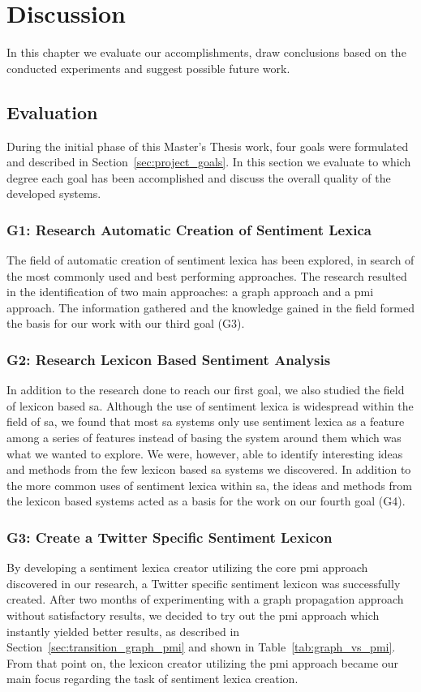 \chapter{Discussion}
\label{cha:discussion}
In this chapter we evaluate our accomplishments, draw conclusions based on the conducted experiments and suggest possible future work. 

\section{Evaluation}
\label{sec:evaluation}
During the initial phase of this Master's Thesis work, four goals were formulated and described in Section~\ref{sec:project_goals}. In this section we evaluate to which degree each goal has been accomplished and discuss the overall quality of the developed systems. 

\subsection*{G1: Research Automatic Creation of Sentiment Lexica}
The field of automatic creation of sentiment lexica has been explored, in search of the most commonly used and best performing approaches. The research resulted in the identification of two main approaches: a graph approach and a \ac{pmi} approach. The information gathered and the knowledge gained in the field formed the basis for our work with our third goal (G3). 

\subsection*{G2: Research Lexicon Based Sentiment Analysis}
In addition to the research done to reach our first goal, we also studied the field of lexicon based \ac{sa}. Although the use of sentiment lexica is widespread within the field of \ac{sa}, we found that most \ac{sa} systems only use sentiment lexica as a feature among a series of features instead of basing the system around them which was what we wanted to explore. We were, however, able to identify interesting ideas and methods from the few lexicon based \ac{sa} systems we discovered. In addition to the more common uses of sentiment lexica within \ac{sa}, the ideas and methods from the lexicon based systems acted as a basis for the work on our fourth goal (G4).  

\subsection*{G3: Create a Twitter Specific Sentiment Lexicon}
By developing a sentiment lexica creator utilizing the core \ac{pmi} approach discovered in our research, a Twitter specific sentiment lexicon was successfully created. After two months of experimenting with a graph propagation approach without satisfactory results, we decided to try out the \ac{pmi} approach which instantly yielded better results, as described in Section~\ref{sec:transition_graph_pmi} and shown in Table~\ref{tab:graph_vs_pmi}. From that point on, the lexicon creator utilizing the \ac{pmi} approach became our main focus regarding the task of sentiment lexica creation. \\

